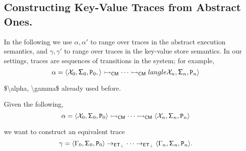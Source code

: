 \subsection{Constructing Key-Value Traces from Abstract Ones.}
In the following we use $\alpha, \alpha'$ to range over traces in the 
abstract execution semantics, and $\gamma, \gamma'$ to range 
over traces in the key-value store semantics. 
In our settings, traces are sequences of transitions in the system; 
for example, 
\[
\alpha = \langle \mathcal{X}_0, \mathsf{\Sigma}_0, \texttt{P}_0, \rangle \rightarrowtail_{\mathsf{CM}} \cdots \rightarrowtail_{\mathsf{CM}} 
langle \mathcal{X}_{n}, \mathsf{\Sigma}_{n}, \texttt{P}_n \rangle
\]

\ac{$\alpha, \gamma$ already used before.}

Given the following,
\[
\alpha = \langle \mathcal{X}_0, \mathsf{\Sigma}_0, \texttt{P}_0 \rangle \rightarrowtail_{\mathsf{CM}} \cdots \rightarrowtail_{\mathsf{CM}} 
\langle \mathcal{X}_n, \mathsf{\Sigma}_n, \texttt{P}_n \rangle
\]

we want to construct an equivalent trace 
\[
\gamma = \langle \Gamma_0, \mathsf{\Sigma}_0, \texttt{P}_0 \rangle \rightarrow_{\mathsf{ET}_{\bot}} \cdots \rightarrow_{\mathsf{ET}_{\bot}} \langle 
\Gamma_{n}, \mathsf{\Sigma}_n, \texttt{P}_n \rangle.
\]

